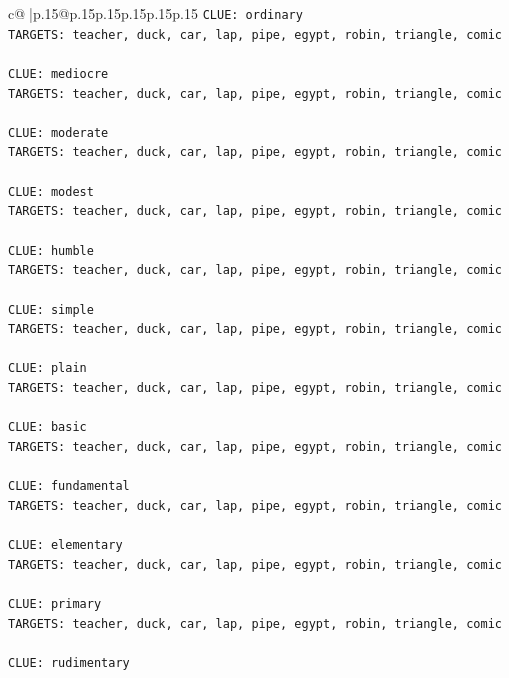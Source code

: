 \documentclass{article}
\begin{document}
{\begin{supertabular}{c@{$\;$}|p{.15\linewidth}@{}p{.15\linewidth}p{.15\linewidth}p{.15\linewidth}p{.15\linewidth}p{.15\linewidth}}
{{{\texttt{CLUE: ordinary} \\
\texttt{TARGETS: teacher, duck, car, lap, pipe, egypt, robin, triangle, comic} \\
\\ 
\texttt{CLUE: mediocre} \\
\texttt{TARGETS: teacher, duck, car, lap, pipe, egypt, robin, triangle, comic} \\
\\ 
\texttt{CLUE: moderate} \\
\texttt{TARGETS: teacher, duck, car, lap, pipe, egypt, robin, triangle, comic} \\
\\ 
\texttt{CLUE: modest} \\
\texttt{TARGETS: teacher, duck, car, lap, pipe, egypt, robin, triangle, comic} \\
\\ 
\texttt{CLUE: humble} \\
\texttt{TARGETS: teacher, duck, car, lap, pipe, egypt, robin, triangle, comic} \\
\\ 
\texttt{CLUE: simple} \\
\texttt{TARGETS: teacher, duck, car, lap, pipe, egypt, robin, triangle, comic} \\
\\ 
\texttt{CLUE: plain} \\
\texttt{TARGETS: teacher, duck, car, lap, pipe, egypt, robin, triangle, comic} \\
\\ 
\texttt{CLUE: basic} \\
\texttt{TARGETS: teacher, duck, car, lap, pipe, egypt, robin, triangle, comic} \\
\\ 
\texttt{CLUE: fundamental} \\
\texttt{TARGETS: teacher, duck, car, lap, pipe, egypt, robin, triangle, comic} \\
\\ 
\texttt{CLUE: elementary} \\
\texttt{TARGETS: teacher, duck, car, lap, pipe, egypt, robin, triangle, comic} \\
\\ 
\texttt{CLUE: primary} \\
\texttt{TARGETS: teacher, duck, car, lap, pipe, egypt, robin, triangle, comic} \\
\\ 
\texttt{CLUE: rudimentary} \\
}}}
\end{supertabular}}
\end{document}

